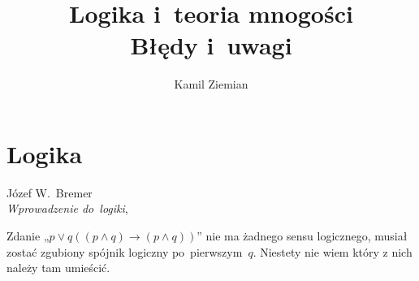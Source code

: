 \documentclass[a4paper,11pt]{article}
\title{Logika i~teoria mnogości \\
  {\Large Błędy i~uwagi}}
\author{Kamil Ziemian}
\numberwithin{equation}{section}
\begin{document}





\maketitle





\section{Logika}




Józef W.~Bremer \\
\textit{Wprowadzenie do~logiki},
\cite{Bremer-Wprowadzenie-do-logiki-Wyd-2004}






\noindent
{} Zdanie „$p \vee q ( ( p \land q ) \to ( p \land q ) )$” nie ma
żadnego sensu logicznego, musiał zostać zgubiony spójnik logiczny
po~pierwszym~$q$. Niestety nie wiem który z nich należy tam umieścić.





\end{document}

